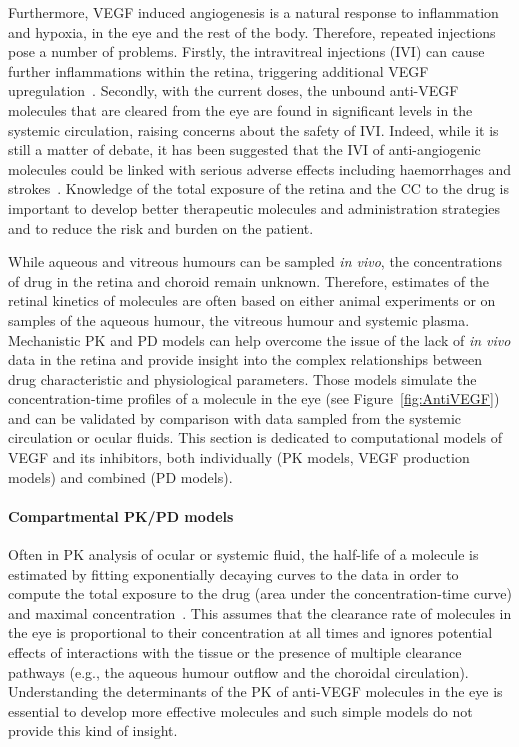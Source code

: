 \documentclass{article}
\begin{document}
Furthermore, VEGF induced angiogenesis is a natural response to inflammation and hypoxia, in the eye and the rest of the body. 
Therefore, repeated injections pose a number of problems.
Firstly, the intravitreal injections (IVI) can cause further inflammations within the retina, triggering additional VEGF upregulation~\cite{Iyer_2022}.
Secondly, with the current doses, the unbound anti-VEGF molecules that are cleared from the eye are found in significant levels in the systemic circulation, raising concerns about the safety of IVI.
Indeed, while it is still a matter of debate, it has been suggested that the IVI of anti-angiogenic molecules could be linked with serious adverse effects including haemorrhages and strokes~\cite{Avery_2016, Kaiser_2019, Maloney_2021}.
Knowledge of the total exposure of the retina and the CC to the drug is important to develop better therapeutic molecules and administration strategies and to reduce the risk and burden on the patient.

While aqueous and vitreous humours can be sampled \textit{in vivo}, the concentrations of drug in the retina and choroid remain unknown. 
Therefore, estimates of the retinal kinetics of molecules are often based on either animal experiments or on samples of the aqueous humour, the vitreous humour and systemic plasma.
Mechanistic PK and PD models can help overcome the issue of the lack of \textit{in vivo} data in the retina and provide insight into the complex relationships between drug characteristic and physiological parameters.
Those models simulate the concentration-time profiles of a molecule in the eye (see Figure~\ref{fig:AntiVEGF}) and can be validated by comparison with data sampled from the systemic circulation or ocular fluids.
This section is dedicated to computational models of VEGF and its inhibitors, both individually (PK models, VEGF production models) and combined (PD models).

\paragraph*{Compartmental PK/PD models}

Often in PK analysis of ocular or systemic fluid, the half-life of a molecule is estimated by fitting exponentially decaying curves to the data in order to compute the total exposure to the drug (area under the concentration-time curve) and maximal concentration~\cite{Bakri_2007, Kaiser_2019, Park_2015, Park_2016, Xu_2013}.
This assumes that the clearance rate of molecules in the eye is proportional to their concentration at all times and ignores potential effects of interactions with the tissue or the presence of multiple clearance pathways (e.g., the aqueous humour outflow and the choroidal circulation).
Understanding the determinants of the PK of anti-VEGF molecules in the eye is essential to develop more effective molecules and such simple models do not provide this kind of insight.
\end{document}
